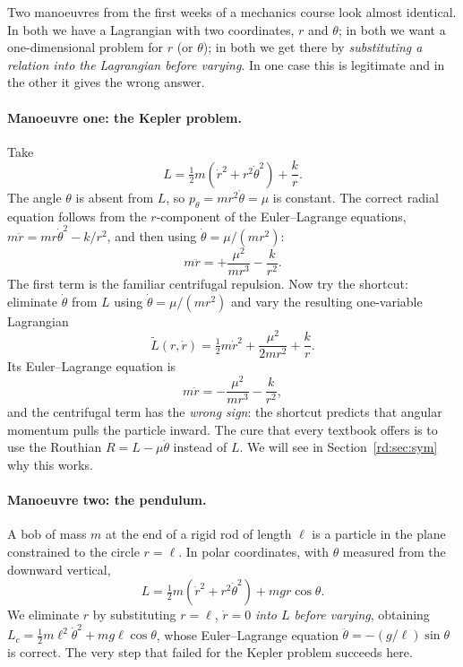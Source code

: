 Two manoeuvres from the first weeks of a mechanics course look
almost identical. In both we have a Lagrangian with two
coordinates, $r$ and $\theta$; in both we want a one-dimensional
problem for $r$ (or $\theta$); in both we get there by
\emph{substituting a relation into the Lagrangian before varying}.
In one case this is legitimate and in the other it gives the wrong
answer.

\paragraph{Manoeuvre one: the Kepler problem.} Take
\begin{equation}\label{rd:Lkep}
L=\tfrac12m(\dot r^2+r^2\dot\theta^2)+\frac kr .
\end{equation}
The angle $\theta$ is absent from $L$, so
$p_\theta=mr^2\dot\theta=\mu$ is constant. The correct radial
equation follows from the $r$-component of the Euler--Lagrange
equations, $m\ddot r=mr\dot\theta^2-k/r^2$, and then using
$\dot\theta=\mu/(mr^2)$:
\begin{equation}\label{rd:kepcorrect}
m\ddot r=+\frac{\mu^2}{mr^3}-\frac{k}{r^2}.
\end{equation}
The first term is the familiar centrifugal repulsion. Now try the
shortcut: eliminate $\dot\theta$ from $L$ using
$\dot\theta=\mu/(mr^2)$ and vary the resulting one-variable
Lagrangian
\begin{equation}\label{rd:Lnaive}
\tilde L(r,\dot r)=\tfrac12m\dot r^2+\frac{\mu^2}{2mr^2}+\frac kr .
\end{equation}
Its Euler--Lagrange equation is
\begin{equation}\label{rd:kepwrong}
m\ddot r=-\frac{\mu^2}{mr^3}-\frac k{r^2},
\end{equation}
and the centrifugal term has the \emph{wrong sign}: the shortcut
predicts that angular momentum pulls the particle inward. The cure
that every textbook offers is to use the Routhian
$R=L-\mu\dot\theta$ instead of $L$. We will see in
Section~\ref{rd:sec:sym} why this works.

\paragraph{Manoeuvre two: the pendulum.} A bob of mass $m$ at the
end of a rigid rod of length $\ell$ is a particle in the plane
constrained to the circle $r=\ell$. In polar coordinates, with
$\theta$ measured from the downward vertical,
\begin{equation}\label{rd:Lpend}
L=\tfrac12m(\dot r^2+r^2\dot\theta^2)+mgr\cos\theta .
\end{equation}
We eliminate $r$ by substituting $r=\ell$, $\dot r=0$ \emph{into
$L$ before varying}, obtaining
$L_c=\tfrac12m\ell^2\dot\theta^2+mg\ell\cos\theta$, whose
Euler--Lagrange equation $\ddot\theta=-(g/\ell)\sin\theta$ is
correct. The very step that failed for the Kepler problem succeeds
here.

